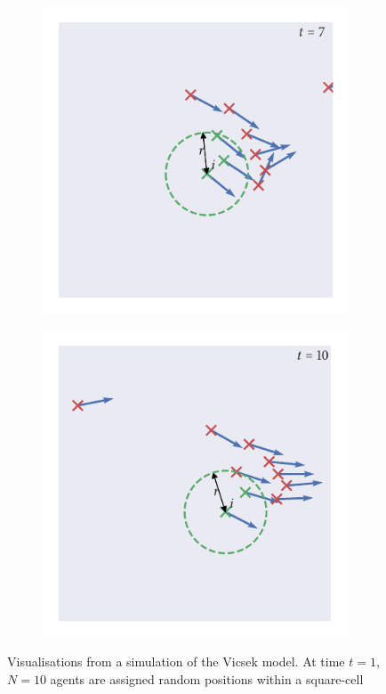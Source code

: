 \begin{figure}[tb]
\begin{subfigure}[b]{0.5\textwidth}
        \includegraphics{vicsek_simulation_7.pdf}
    \end{subfigure}%
    \begin{subfigure}[b]{0.5\textwidth}
        \includegraphics{vicsek_simulation_10.pdf}
    \end{subfigure}
    \caption{Visualisations from a simulation of the Vicsek model. At time
      $t=1$, $N=10$ agents are assigned random positions within a square-cell
}
\end{figure}
